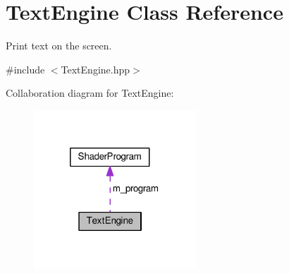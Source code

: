 \hypertarget{classTextEngine}{\section{Text\+Engine Class Reference}
\label{classTextEngine}
}


Print text on the screen.  




{\ttfamily \#include $<$Text\+Engine.\+hpp$>$}



Collaboration diagram for Text\+Engine\+:\nopagebreak
\begin{figure}[H]
\begin{center}
\leavevmode
\includegraphics[width=173pt]{classTextEngine__coll__graph}
\end{center}
\end{figure}
